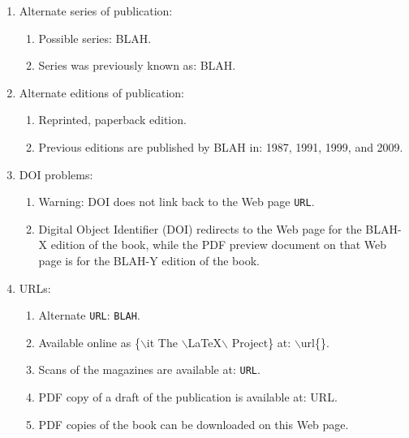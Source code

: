 \documentclass[letter,12pt]{article}
\begin{document}
\begin{enumerate}
\begin{enumerate}
\begin{enumerate}
\begin{enumerate}
			\end{enumerate}
		\item Actual title, not used in the {\tt Title} field due to typesetting errors: {\it Actual title for the document/publication}.
		\end{enumerate}
	\item Alternate series of publication: \vspace{-0.2cm}
		\begin{enumerate} \itemsep -2pt
		\item Possible series: BLAH.
		\item Series was previously known as: BLAH.
		\end{enumerate}
	\item Alternate editions of publication: \vspace{-0.2cm}
		\begin{enumerate} \itemsep -2pt
		\item Reprinted, paperback edition.
		\item Previous editions are published by BLAH in: 1987, 1991, 1999, and 2009.
		\end{enumerate}
	\item DOI problems: \vspace{-0.2cm}
		\begin{enumerate} \itemsep -2pt
		\item Warning: DOI does not link back to the Web page {\tt URL}.
		\item Digital Object Identifier (DOI) redirects to the Web page for the BLAH-X edition of the book, while the PDF preview document on that Web page is for the BLAH-Y edition of the book.
		\end{enumerate}
	\item URLs: \vspace{-0.2cm}
		\begin{enumerate} \itemsep -2pt
		\item Alternate {\tt URL}: {\tt BLAH}.
		\item Available online as \{$\backslash$it The $\backslash$LaTeX$\backslash$ Project\} at: $\backslash$url\{\}.
		\item Scans of the magazines are available at: {\tt URL}.
		\item PDF copy of a draft of the publication is available at: URL.
		\item PDF copies of the book can be downloaded on this Web page.

\end{enumerate}
\end{enumerate}
\end{enumerate}
\end{document}
